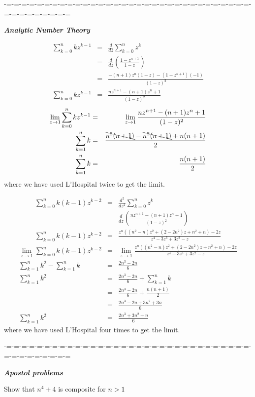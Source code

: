 \documentclass[aps,preprint,preprintnumbers,nofootinbib,showpacs,prd]{revtex4-1}
\newcommand{\nbea}{\begin{eqnarray*}}
\newcommand{\neea}{\end{eqnarray*}}
\begin{document}
-=-=-=-=-=-=-=-=-=-=-=-=-=-=-=-=-=-=-=-=-=-=-=-=-=-=-=-=-=-=-=-=-=-=-=-=-=-=-=-=-=

\bigskip
\textit{\textbf{Analytic Number Theory}}
\smallskip

%
\nbea
\sum_{k=0}^{n} k z^{k-1} & = & \frac{d}{dz}\sum_{k=0}^{n} z^{k} \\
& = & \frac{d}{dz} \left ( \frac{1 - z^{n+1}}{1-z} \right ) \\
& = & \frac{- (n+1)z^{n}(1-z) - (1 - z^{n+1})(-1)}{(1-z)^2} \\
\sum_{k=0}^{n} k z^{k-1} & = & \frac{nz^{n+1} - (n+1)z^{n} + 1}{(1-z)^2}
\neea
%
%
\nbea
\lim_{z\to1}  \sum_{k=0}^{n} k z^{k-1}  & = & \lim_{z\to1} \frac{nz^{n+1} - (n+1)z^{n} + 1}{(1-z)^2} \\
\sum_{k=1}^{n} k & = & \frac{\bcancel{n^2(n+1)} - \bcancel{n^2(n+1)} + n(n+1)}{2} \\
\sum_{k=1}^{n} k & = & \frac{n(n+1)}{2} 
\neea
%
where we have used L'Hospital twice to get the limit.

%
\nbea
\sum_{k=0}^{n} k(k-1) z^{k-2} & = & \frac{d^2}{dz^2}\sum_{k=0}^{n} z^{k} \\
& = & \frac{d}{dz} \left ( \frac{nz^{n+1} - (n+1)z^{n} + 1}{(1-z)^2} \right ) \\
\sum_{k=0}^{n} k(k-1) z^{k-2} & = & \frac{z^n((n^2-n)z^2+(2-2n^2)z+n^2+n)-2z}{z^4-3z^3+3z^2-z}
\neea
%
%
\nbea
\lim_{z\to1} \sum_{k=0}^{n} k(k-1) z^{k-2}  & = & \lim_{z\to1} \frac{z^n((n^2-n)z^2+(2-2n^2)z+n^2+n)-2z}{z^4-3z^3+3z^2-z} \\
\sum_{k=1}^{n} k^2 - \sum_{k=1}^{n} k & = & \frac{2n^3-2n}{6} \\
\sum_{k=1}^{n} k^2 & = &  \frac{2n^3-2n}{6} + \sum_{k=1}^{n} k \\
& = & \frac{2n^3-2n}{6} + \frac{n(n+1)}{2} \\
& = & \frac{2n^3-2n + 3n^2+ 3n}{6} \\
\sum_{k=1}^{n} k^2 & = & \frac{2n^3 + 3n^2+ n}{6}
\neea
%
where we have used L'Hospital four times to get the limit.


-=-=-=-=-=-=-=-=-=-=-=-=-=-=-=-=-=-=-=-=-=-=-=-=-=-=-=-=-=-=-=-=-=-=-=-=-=-=-=-=-=

\bigskip
\textit{\textbf{Apostol problems}}
\smallskip

Show that $n^4 + 4$ is composite for $n > 1$
\end{document}
